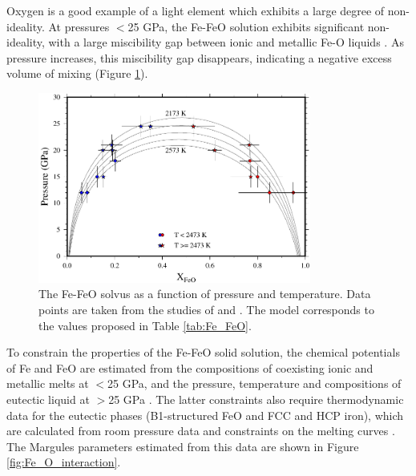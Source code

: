 \documentclass[review]{elsarticle}
\begin{document}
Oxygen is a good example of a light element which exhibits a large degree of non-ideality. At pressures $<$25 GPa, the Fe-FeO solution exhibits significant non-ideality, with a large miscibility gap between ionic and metallic Fe-O liquids \citep{KS1995,TOT2007,Frostetal2010}. As pressure increases, this miscibility gap disappears, indicating a negative excess volume of mixing (Figure \ref{fig:Fe_O_solvus}).

\begin{figure}[ht!]
  \centering
  \includegraphics[width=0.8\textwidth]{figures/Fe_FeO_solvus}
  \caption{The Fe-FeO solvus as a function of pressure and temperature. Data points are taken from the studies of \cite{TOT2007} and \cite{Frostetal2010}. The model corresponds to the values proposed in Table \ref{tab:Fe_FeO}.}
  \label{fig:Fe_O_solvus}
\end{figure}

To constrain the properties of the Fe-FeO solid solution, the chemical potentials of Fe and FeO are estimated from the compositions of coexisting ionic and metallic melts at $<$25 GPa, and the pressure, temperature and compositions of eutectic liquid at $>$25 GPa \citep{SHCPW2008}. The latter constraints also require thermodynamic data for the eutectic phases (B1-structured FeO and FCC and HCP iron), which are calculated from room pressure data and constraints on the melting curves \citep{SHCPW2008, OTHOH2011, ADMLM2013, Kom2014}.  The Margules parameters estimated from this data are shown in Figure \ref{fig:Fe_O_interaction}. 
\end{document}
